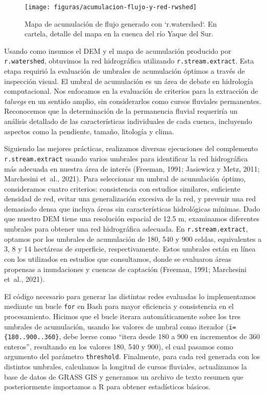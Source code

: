 \documentclass[spanish]{article}
\begin{document}
\begin{figure}

{\centering \texttt{[image: figuras/acumulacion-flujo-y-red-rwshed]} 

}

\caption{Mapa de acumulación de flujo generado con `r.watershed`. En cartela, detalle del mapa en la cuenca del río Yaque del Sur.}\label{fig:acumyredrwshed}
\end{figure}

Usando como insumos el DEM y el mapa de acumulación producido por
\texttt{r.watershed}, obtuvimos la red hidrográfica utilizando
\texttt{r.stream.extract}. Esta etapa requirió la evaluación de umbrales
de acumulación óptimos a través de inspección visual. El umbral de
acumulación es un área de debate en hidrología computacional. Nos
enfocamos en la evaluación de criterios para la extracción de
\emph{talwegs} en un sentido amplio, sin considerarlos como cursos
fluviales permanentes. Reconocemos que la determinación de la
permanencia fluvial requeriría un análisis detallado de las
características individuales de cada cuenca, incluyendo aspectos como la
pendiente, tamaño, litología y clima.

Siguiendo las mejores prácticas, realizamos diversas ejecuciones del
complemento \texttt{r.stream.extract} usando varios umbrales para
identificar la red hidrográfica más adecuada en nuestra área de interés
(Freeman, 1991; Jasiewicz y Metz, 2011; Marchesini et~al., 2021). Para
seleccionar un umbral de acumulación óptimo, consideramos cuatro
criterios: consistencia con estudios similares, suficiente densidad de
red, evitar una generalización excesiva de la red, y prevenir una red
demasiado densa que incluya áreas sin características hidrológicas
mínimas. Dado que nuestro DEM tiene una resolución espacial de 12.5 m,
examinamos diferentes umbrales para obtener una red hidrográfica
adecuada. En \texttt{r.stream.extract}, optamos por los umbrales de
acumulación de 180, 540 y 900 celdas, equivalentes a 3, 8 y 14 hectáreas
de superficie, respectivamente. Estos umbrales están en línea con los
utilizados en estudios que consultamos, donde se evaluaron áreas
propensas a inundaciones y cuencas de captación (Freeman, 1991;
Marchesini et~al., 2021).

El código necesario para generar las distintas redes evaluadas lo
implementamos mediante un bucle \texttt{for} en Bash para mayor
eficiencia y consistencia en el procesamiento. Hicimos que el bucle
iterara automáticamente sobre los tres umbrales de acumulación, usando
los valores de umbral como iterador (\texttt{i=\{180..900..360\}}, debe
leerse como ``itera desde 180 a 900 en incrementos de 360 enteros'',
resultando en los valores 180, 540 y 900), el cual pasamos como
argumento del parámetro \texttt{threshold}. Finalmente, para cada red
generada con los distintos umbrales, calculamos la longitud de cursos
fluviales, actualizamos la base de datos de GRASS GIS y generamos un
archivo de texto resumen que posteriormente importamos a R para obtener
estadísticos básicos.
\end{document}
